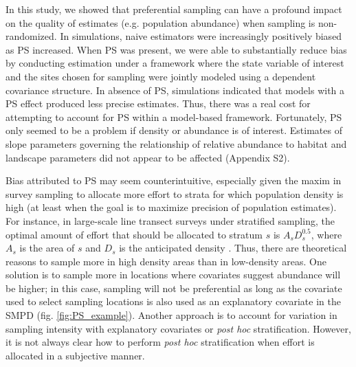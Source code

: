 \documentclass[times,mee,doublespace,]{besauth2}
\begin{document}
In this study, we showed that preferential sampling can have a profound impact on the quality of estimates (e.g. population abundance) when sampling is non-randomized. In simulations, naive estimators were increasingly positively biased as PS increased. When PS was present, we were able to substantially reduce bias by conducting estimation under a framework where the state variable of interest and the sites chosen for sampling were jointly modeled using a dependent covariance structure.  In absence of PS, simulations indicated that models with a PS effect produced less precise estimates. Thus, there was a real cost for attempting to account for PS within a model-based framework.  Fortunately, PS only seemed to be a problem if density or abundance is of interest. Estimates of slope parameters governing the relationship of relative abundance to habitat and landscape parameters did not appear to be affected (Appendix S2).

Bias attributed to PS may seem counterintuitive, especially given the maxim in survey sampling to allocate more effort to strata for which population density is high (at least when the goal is to maximize precision of population estimates). For instance, in large-scale line transect surveys under stratified sampling, the optimal amount of effort that should be allocated to stratum $s$ is $A_s D_s^{0.5}$, where $A_s$ is the area of $s$ and $D_s$ is the anticipated density \citep[][eqn 7.7]{BucklandEtAl2001}.  Thus, there are theoretical reasons to sample more in high density areas than in low-density areas. One solution is to sample more in locations where covariates suggest abundance will be higher; in this case, sampling will not be preferential as long as the covariate used to select sampling locations is also used as an explanatory covariate in the SMPD (fig. \ref{fig:PS_example}).  Another approach is to account for variation in sampling intensity with explanatory covariates or \textit{post hoc} stratification. However, it is not always clear how to perform \textit{post hoc} stratification when effort is allocated in a subjective manner.
\end{document}
